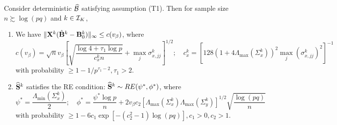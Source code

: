 \documentclass[fleqn,11pt]{article}
\numberwithin{equation}{section}
\begin{document}

\begin{Proposition}\label{prop:ErrorRE}
Consider deterministic $\widehat {{\cal{B}}}$ satisfying assumption (T1). Then for sample size $n \succsim \log (pq)$ and $k \in {\cal{I}}_K$,

\begin{enumerate}
\item We have $\| {\mathbf{X}}^k ( \hat {{\mathbf{B}}}^k - {\mathbf{B}}_0^k ) \|_\infty \leq c( v_\beta)$, where
%
$$
c(v_\beta) =\sqrt n v_\beta \left[ \sqrt{ \frac{ \log 4 + \tau_1 \log p}{c_x^k n}} + \max_j \sigma_{x,jj}^k \right]^{1/2}; \quad
c_x^k = \left[ 128 ( 1 + 4 \Lambda_{\max} (\Sigma_x^k)  )^2 \max_j (\sigma_{x,jj}^k)^2 \right]^{-1}
$$
%
with probability $ \geq 1 - 1/p^{\tau_1-2}, \tau_1 > 2$.
%
\item $\widehat {{\mathbf{S}}}^k$ satisfies the RE condition: $ \widehat {{\mathbf{S}}}^k \sim RE (\psi^*, \phi^*)$, where 
%
$$
\psi^* = \frac{ \Lambda_{\min} (\Sigma_x^k)}{2}; \quad \phi^* = \frac{ \psi^* \log p}{n} + 2 v_\beta c_2 [ \Lambda_{\max} (\Sigma_x^k) \Lambda_{\max} (\Sigma_y^k) ]^{1/2} \sqrt{\frac{ \log(pq)}{n}}
$$
%
with probability $\geq 1 - 6c_1 \exp [-(c_2^2-1) \log(pq)], c_1 > 0, c_2 > 1$.
\end{enumerate} 
\end{Proposition}
\end{document}
